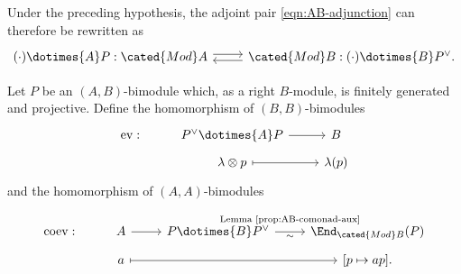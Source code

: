 Under the preceding hypothesis, the adjoint pair
\eqref{eqn:AB-adjunction} can therefore be rewritten as
\begin{equation}\label{eqn:AB-adjunction-2}\begin{tikzcd}
	(\cdot) \dotimes{A} P : \cated{Mod}A \arrow[shift left, r] & \cated{Mod}B: (\cdot) \dotimes{B} P^\vee . \arrow[shift left, l]
\end{tikzcd}\end{equation}

\begin{definition}\label{def:bimodule-ev-coev}
	Let $P$ be an $(A,B)$-bimodule which, as a right $B$-module, is finitely
	generated and projective. Define the homomorphism of $(B,B)$-bimodules
	\[\begin{tikzcd}[row sep=tiny]
		\mathrm{ev}: & P^\vee \dotimes{A} P \arrow[r] & B \\
		& \lambda \otimes p \arrow[mapsto, r] & \lambda(p)
	\end{tikzcd}\]
	and the homomorphism of $(A,A)$-bimodules
	\[\begin{tikzcd}[row sep=tiny]
		\mathrm{coev}: & A \arrow[r] & P \dotimes{B} P^\vee \arrow[r, "{\text{Lemma \ref{prop:AB-comonad-aux}}}" inner sep=0.6em, "\sim"'] & \End_{\cated{Mod}B}(P) \\
		& a \arrow[mapsto, rr] & & {[p \mapsto ap]} .
	\end{tikzcd}\]
\end{definition}

